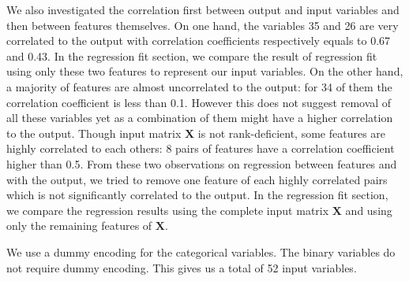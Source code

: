 \documentclass{article} %
\begin{document}
  We also investigated the correlation first between output and input variables and then between features themselves. On one hand, the variables  35 and 26 are very correlated to the output with correlation coefficients respectively equals to 0.67 and 0.43. In the regression fit section, we compare the result of regression fit using only these two features to represent our input variables. On the other hand, a majority of features are almost uncorrelated to the output: for 34 of them the correlation coefficient is less than 0.1. However this does not suggest removal of all these variables yet as a combination of them might have a higher correlation to the output. Though input matrix $\mathbf{X}$ is not rank-deficient, some features are highly correlated to each others: 8 pairs of features have a correlation coefficient higher than 0.5. From these two observations on regression between features and with the output, we tried to remove one feature of each highly correlated pairs which is not significantly correlated to the output. In the regression fit section, we compare the regression results using the complete input matrix $\mathbf{X}$ and using only the remaining features of $\mathbf{X}$.
  
  We use a dummy encoding for the categorical variables. The binary variables do not require dummy encoding. This gives us a total of  52 input variables.
\end{document}
